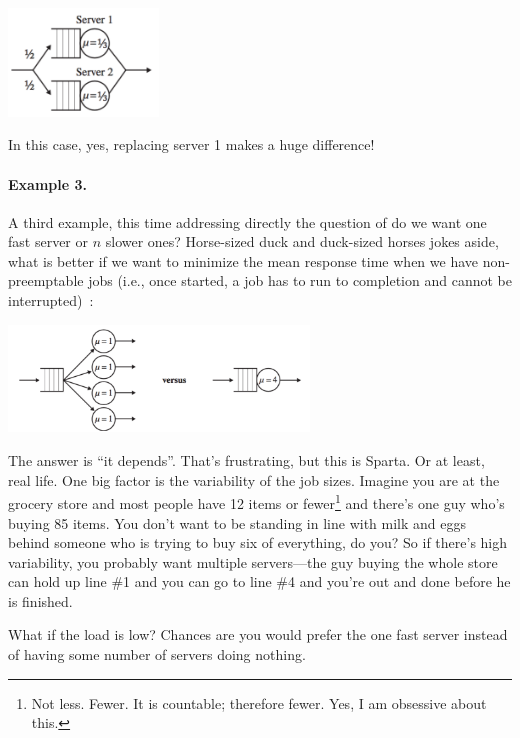 \documentclass[a4paper]{report}
\begin{document}
\begin{center}
	\includegraphics[width=0.3\textwidth]{images/qt-example2-2.png}
\end{center}

In this case, yes, replacing server 1 makes a huge difference!

\paragraph{Example 3.} A third example, this time addressing directly the question of do we want one fast server or $n$ slower ones? Horse-sized duck and duck-sized horses jokes aside, what is better if we want to minimize the mean response time when we have non-preemptable jobs (i.e., once started, a job has to run to completion and cannot be interrupted)~\cite{pmd}:


\begin{center}
	\includegraphics[width=0.6\textwidth]{images/qt-example3.png}
\end{center}

The answer is ``it depends''. That's frustrating, but this is Sparta. Or at least, real life. One big factor is the variability of the job sizes. Imagine you are at the grocery store and most people have 12 items or fewer\footnote{Not less. Fewer. It is countable; therefore fewer. Yes, I am obsessive about this.} and there's one guy who's buying 85 items. You don't want to be standing in line with milk and eggs behind someone who is trying to buy six of everything, do you? So if there's high variability, you probably want multiple servers---the guy buying the whole store can hold up line \#1 and you can go to line \#4 and you're out and done before he is finished.

What if the load is low? Chances are you would prefer the one fast server instead of having some number of servers doing nothing.
\end{document}
